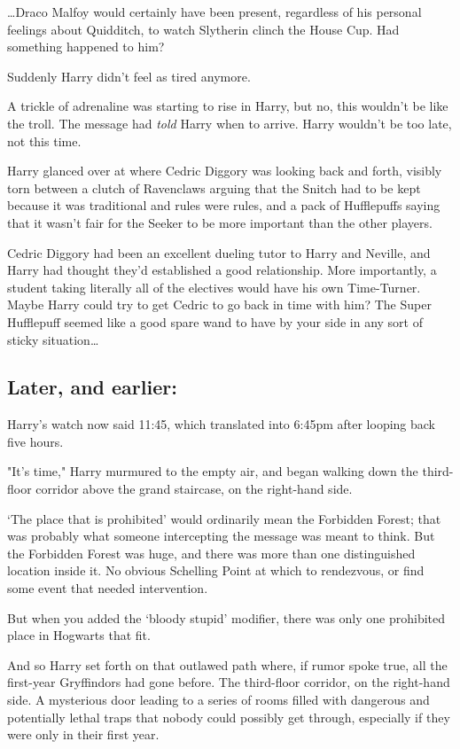 {\ldots}Draco Malfoy would certainly have been present, regardless of his 
personal feelings about Quidditch, to watch Slytherin clinch the House Cup. Had 
something happened to him?

Suddenly Harry didn't feel as tired anymore.

A trickle of adrenaline was starting to rise in Harry, but no, this wouldn't be 
like the troll. The message had \emph{told} Harry when to arrive. Harry 
wouldn't be too late, not this time.

Harry glanced over at where Cedric Diggory was looking back and forth, visibly 
torn between a clutch of Ravenclaws arguing that the Snitch had to be kept 
because it was traditional and rules were rules, and a pack of Hufflepuffs 
saying that it wasn't fair for the Seeker to be more important than the other 
players.

Cedric Diggory had been an excellent dueling tutor to Harry and Neville, and 
Harry had thought they'd established a good relationship. More importantly, a 
student taking literally all of the electives would have his own Time-Turner. 
Maybe Harry could try to get Cedric to go back in time with him? The Super 
Hufflepuff seemed like a good spare wand to have by your side in any sort of 
sticky situation{\ldots}
\sbreak
\vspace{-2\baselineskip}
\subsection{Later, and earlier:}

Harry's watch now said 11:45, which translated into 6:45pm after looping back 
five hours.

"It's time," Harry murmured to the empty air, and began walking down the 
third-floor corridor above the grand staircase, on the right-hand side.

`The place that is prohibited' would ordinarily mean the Forbidden Forest; that 
was probably what someone intercepting the message was meant to think. But the 
Forbidden Forest was huge, and there was more than one distinguished location 
inside it. No obvious Schelling Point at which to rendezvous, or find some 
event that needed intervention.

But when you added the `bloody stupid' modifier, there was only one prohibited 
place in Hogwarts that fit.

And so Harry set forth on that outlawed path where, if rumor spoke true, all 
the first-year Gryffindors had gone before. The third-floor corridor, on the 
right-hand side. A mysterious door leading to a series of rooms filled with 
dangerous and potentially lethal traps that nobody could possibly get through, 
especially if they were only in their first year.

